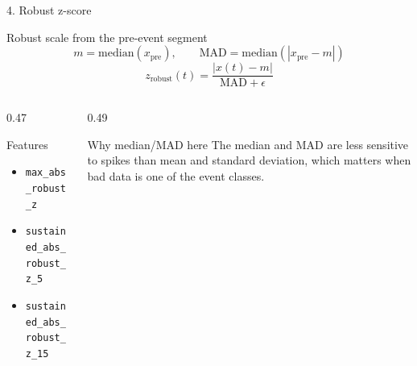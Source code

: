 \documentclass[10pt,aspectratio=169]{beamer}
\newcommand{\code}[1]{\texttt{\footnotesize #1}}
\begin{document}
\begin{frame}{4. Robust z-score}
\small
\begin{block}{Robust scale from the pre-event segment}
\[
m=\mathrm{median}(x_{\mathrm{pre}}),\qquad
\mathrm{MAD}=\mathrm{median}(|x_{\mathrm{pre}}-m|)
\]
\[
z_{\mathrm{robust}}(t)=\frac{|x(t)-m|}{\mathrm{MAD}+\epsilon}
\]
\end{block}
\begin{columns}[T,totalwidth=\textwidth]
\begin{column}{0.47\textwidth}
\begin{exampleblock}{Features}
\begin{itemize}
  \item \code{max\_abs\_robust\_z}
  \item \code{sustained\_abs\_robust\_z\_5}
  \item \code{sustained\_abs\_robust\_z\_15}
\end{itemize}
\end{exampleblock}
\end{column}
\begin{column}{0.49\textwidth}
\begin{alertblock}{Why median/MAD here}
The median and MAD are less sensitive to spikes than mean and standard deviation, which matters when bad data is one of the event classes.
\end{alertblock}
\end{column}
\end{columns}
\end{frame}
\end{document}
